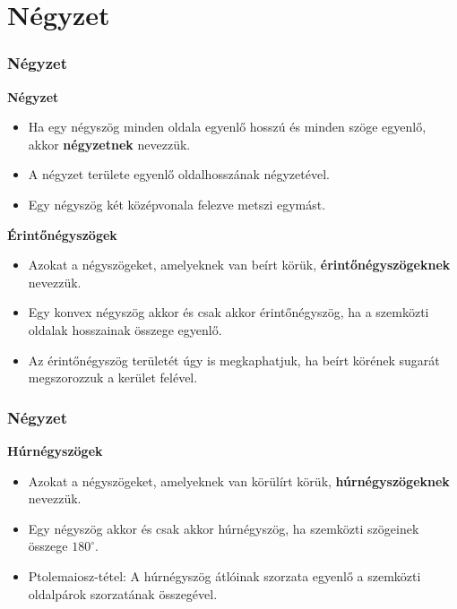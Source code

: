 \documentclass[11pt]{beamer}
\begin{document}
\section{\textbf{Négyzet}}
\begin{frame}[<+->]
\frametitle{Négyzet}
\begin{block}{\textbf{Négyzet}}
\begin{itemize}[label=$\circ$]
\item Ha egy négyszög minden oldala egyenlő hosszú és minden szöge egyenlő, akkor \textbf{négyzetnek} nevezzük.
\item A négyzet területe egyenlő oldalhosszának négyzetével.
\item Egy négyszög két középvonala felezve metszi egymást.
\end{itemize}
\end{block}

\begin{block}{\textbf{Érintőnégyszögek}}
\begin{itemize}[label=$\circ$]
\item Azokat a négyszögeket, amelyeknek van beírt körük, \textbf{érintőnégyszögeknek} nevezzük.
\item Egy konvex négyszög akkor és csak akkor érintőnégyszög, ha a szemközti oldalak hosszainak összege egyenlő.
\item Az érintőnégyszög területét úgy is megkaphatjuk, ha beírt körének sugarát megszorozzuk a kerület felével.
\end{itemize}
\end{block}
\end{frame}

\begin{frame}[<+->]
\frametitle{Négyzet}
\begin{block}{\textbf{Húrnégyszögek}}
\begin{itemize}[label=$\circ$]
\item Azokat a négyszögeket, amelyeknek van körülírt körük, \textbf{húrnégyszögeknek} nevezzük.
\item Egy négyszög akkor és csak akkor húrnégyszög, ha szemközti szögeinek összege $180^\circ$.
\item Ptolemaiosz-tétel: A húrnégyszög átlóinak szorzata egyenlő a szemközti oldalpárok szorzatának összegével.
\end{itemize}
\end{block}
\end{frame}
\end{document}
